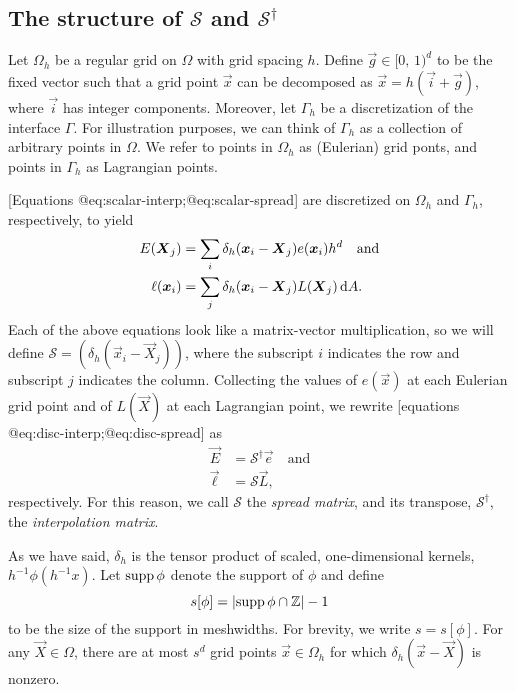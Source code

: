 \subsection{The structure of $\mathcal{S}$ and $\mathcal{S}^\dagger$}

Let $\Omega_h$ be a regular grid on $\Omega$ with grid spacing $h$. Define
$\vec{g} \in [0,\,1)^d$ to be the fixed vector such that a grid point $\vec{x}$
can be decomposed as $\vec{x}=h(\vec{i}+\vec{g})$, where $\vec{i}$ has integer
components. Moreover, let $\Gamma_h$ be a discretization of the interface
$\Gamma$. For illustration purposes, we can think of $\Gamma_h$ as a collection
of arbitrary points in $\Omega$. We refer to points in $\Omega_h$ as (Eulerian)
grid ponts, and points in $\Gamma_h$ as Lagrangian points.

[Equations @eq:scalar-interp;@eq:scalar-spread] are discretized on $\Omega_h$
and $\Gamma_h$, respectively, to yield
\begin{align}
    \label{eq:disc-interp}
    E(\vec{X}_j) &= \sum_i \delta_h(\vec{x}_i-\vec{X}_j)e(\vec{x}_i) h^d \quad \text{and} \\
    \label{eq:disc-spread}
    \ell(\vec{x}_i) &= \sum_j \delta_h(\vec{x}_i-\vec{X}_j)L(\vec{X}_j) \d A.
\end{align}
Each of the above equations look like a matrix-vector multiplication, so we 
will define $\mathcal{S}=(\delta_h(\vec{x}_i-\vec{X}_j))$, where the subscript
$i$ indicates the row and subscript $j$ indicates the column. Collecting the
values of $e(\vec{x})$ at each Eulerian grid point and of $L(\vec{X})$ at
each Lagrangian point, we rewrite [equations @eq:disc-interp;@eq:disc-spread]
as
\begin{align}
    \label{eq:matrix-interp}
    \vec{E} &= \mathcal{S}^\dagger\vec{e} \quad\text{and} \\
    \label{eq:matrix-spread}
    \vec{\ell} &= \mathcal{S}\vec{L},
\end{align}
respectively. For this reason, we call $\mathcal{S}$ the \emph{spread matrix},
and its transpose, $\mathcal{S}^\dagger$, the \emph{interpolation matrix}.

As we have said, $\delta_h$ is the tensor product of scaled, one-dimensional
kernels, $h^{-1}\phi(h^{-1}x)$. Let $\mathrm{supp}\mskip\thinmuskip\phi$
denote the support of $\phi$ and define
\begin{equation}
    s[\phi] = |\mathrm{supp}\mskip\thinmuskip\phi\cap\mathbb{Z}|-1
\end{equation}
to be the size of the support in meshwidths. For brevity, we write $s=s[\phi]$.
For any $\vec{X}\in\Omega$, there are at most $s^d$ grid points
$\vec{x}\in\Omega_h$ for which $\delta_h(\vec{x}-\vec{X})$ is nonzero.

